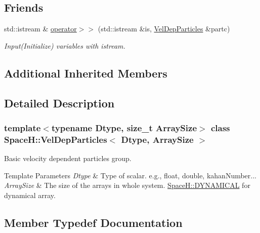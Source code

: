 \subsection*{Friends}
\begin{DoxyCompactItemize}
\item 
std\+::istream \& \mbox{\hyperlink{class_space_h_1_1_vel_dep_particles_a1c8e1f97848175d472220a784c186c6a}{operator$>$$>$}} (std\+::istream \&is, \mbox{\hyperlink{class_space_h_1_1_vel_dep_particles}{Vel\+Dep\+Particles}} \&partc)
\begin{DoxyCompactList}\small\item\em Input(\+Initialize) variables with istream. \end{DoxyCompactList}\end{DoxyCompactItemize}
\subsection*{Additional Inherited Members}


\subsection{Detailed Description}
\subsubsection*{template$<$typename Dtype, size\+\_\+t Array\+Size$>$\newline
class Space\+H\+::\+Vel\+Dep\+Particles$<$ Dtype, Array\+Size $>$}

Basic velocity dependent particles group. 


\begin{DoxyTemplParams}{Template Parameters}
{\em Dtype} & Type of scalar. e.\+g., float, double, kahan\+Number... \\
\hline
{\em Array\+Size} & The size of the arrays in whole system. \mbox{\hyperlink{namespace_space_h_a3e55b9bc2a9e10c08ce8121bce11244a}{Space\+H\+::\+D\+Y\+N\+A\+M\+I\+C\+AL}} for dynamical array. \\
\hline
\end{DoxyTemplParams}


\subsection{Member Typedef Documentation}
\mbox{\label{class_space_h_1_1_vel_dep_particles_a811be78cacdfc2138249181d2c879c3e}} 
